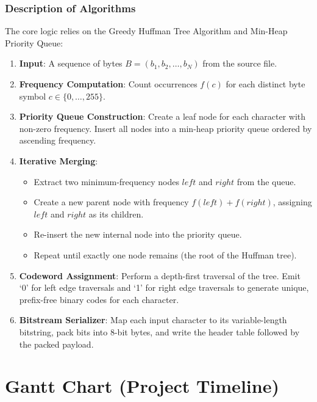 \documentclass[12pt,a4paper]{article}
\begin{document}
\subsubsection{Description of Algorithms}
The core logic relies on the Greedy Huffman Tree Algorithm and Min-Heap Priority Queue:
\begin{enumerate}
    \item \textbf{Input}: A sequence of bytes $B = (b_1, b_2, \dots, b_N)$ from the source file.
    \item \textbf{Frequency Computation}: Count occurrences $f(c)$ for each distinct byte symbol $c \in \{0, \dots, 255\}$.
    \item \textbf{Priority Queue Construction}: Create a leaf node for each character with non-zero frequency. Insert all nodes into a min-heap priority queue ordered by ascending frequency.
    \item \textbf{Iterative Merging}:
    \begin{itemize}
        \item Extract two minimum-frequency nodes $left$ and $right$ from the queue.
        \item Create a new parent node with frequency $f(left) + f(right)$, assigning $left$ and $right$ as its children.
        \item Re-insert the new internal node into the priority queue.
        \item Repeat until exactly one node remains (the root of the Huffman tree).
    \end{itemize}
    \item \textbf{Codeword Assignment}: Perform a depth-first traversal of the tree. Emit `0' for left edge traversals and `1' for right edge traversals to generate unique, prefix-free binary codes for each character.
    \item \textbf{Bitstream Serializer}: Map each input character to its variable-length bitstring, pack bits into 8-bit bytes, and write the header table followed by the packed payload.
\end{enumerate}

\section{Gantt Chart (Project Timeline)}
\end{document}
